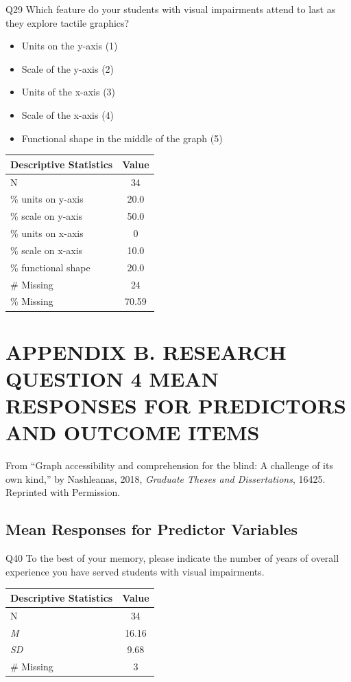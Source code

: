 \documentclass[11.5pt]{sig-alternate} %
\begin{document}
\begin{large}
Q29 Which feature do your students with visual impairments attend to last as they explore tactile graphics? 
\begin{itemize}
    \item Units on the y-axis (1)
    \item Scale of the y-axis (2)
    \item Units of the x-axis (3)
    \item Scale of the x-axis (4)
    \item Functional shape in the middle of the graph (5)
\end{itemize}
\begin{table}[!h]
\centering
\begin{tabular}{lc}
Descriptive Statistics & Value\\ \hline
N	& 34\\
\% units on y-axis	& 20.0\\
\% scale on y-axis	& 50.0\\
\% units on x-axis	& 0\\
\% scale on x-axis &	10.0\\
\% functional shape &	20.0\\
\# Missing	& 24\\
\% Missing	& 70.59\\
\end{tabular}
\end{table}
\clearpage
\section*{APPENDIX B. RESEARCH QUESTION 4 MEAN RESPONSES FOR PREDICTORS AND OUTCOME ITEMS}

From “Graph accessibility and comprehension for the blind: A challenge of its own kind,” by Nashleanas, 2018, \textit{Graduate Theses and Dissertations}, 16425. Reprinted with Permission.

\subsection*{Mean Responses for Predictor Variables}

Q40 To the best of your memory, please indicate the number of years of overall experience you have served students with visual impairments. 
\begin{table}[h]
\centering
\begin{tabular}{lc}
Descriptive Statistics & Value\\ \hline
N  & 34 \\
\textit{M} &	16.16\\
\textit{SD}	& 9.68\\
\# Missing &	3\\
\end{tabular}
\end{table}


\end{large}
\end{document}
